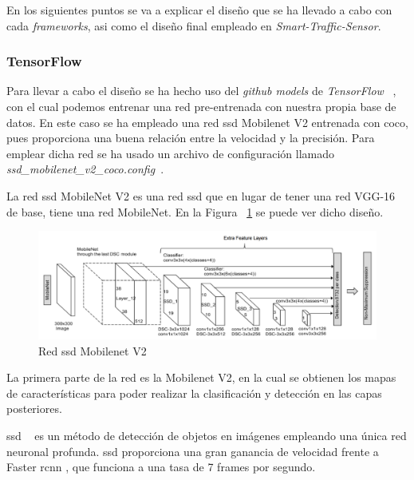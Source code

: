 En los siguientes puntos se va a explicar el diseño que se ha llevado a cabo con cada \textit{frameworks}, asi como el diseño final empleado en \textit{Smart-Traffic-Sensor}.

\subsubsection{TensorFlow}

Para llevar a cabo el diseño se ha hecho uso del \textit{github models} de \textit{TensorFlow} ~\cite{tensorflow_models}, con el cual podemos entrenar una red pre-entrenada con nuestra propia base de datos. En este caso se ha empleado una red \acrfull{ssd} Mobilenet V2 entrenada con \acrshort{coco}, pues proporciona una buena relación entre la velocidad y la precisión. Para emplear dicha red se ha usado un archivo de configuración llamado \textit{ssd\_mobilenet\_v2\_coco.config}~\cite{ssd_mobilenetv2_config}.

La red \acrshort{ssd} MobileNet V2 es una red \acrshort{ssd} que en lugar de tener una red VGG-16 de base, tiene una red MobileNet. En la Figura ~\ref{fig.ssd_mobilenet} se puede ver dicho diseño.

\begin{figure}[H] 
\begin{center}
	\includegraphics[width=1\textwidth]{figures/Diseno_global/ssd_mobilenet.png}
   \caption{Red \acrshort{ssd} Mobilenet V2}
	\label{fig.ssd_mobilenet}
\end{center}
\end{figure}

La primera parte de la red es la Mobilenet V2, en la cual se obtienen los mapas de características para poder realizar la clasificación y detección en las capas posteriores. 

\acrshort{ssd} ~\cite{ssd_article} es un método de detección de objetos en imágenes empleando una única red neuronal profunda. \acrshort{ssd} proporciona una gran ganancia de velocidad frente a Faster \acrshort{rcnn} \cite{rcnn_faster}, que funciona a una tasa de 7 frames por segundo.

